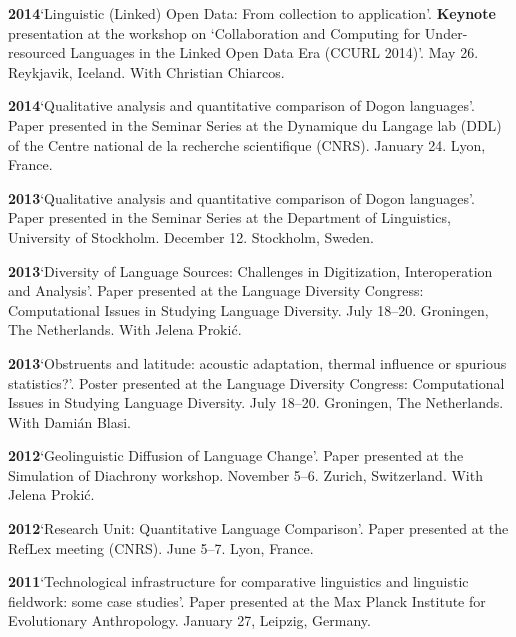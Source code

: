 \documentclass[11pt]{article}
\newcommand{\hangpara}{
 \setlength{\parindent}{0in} %
 \hangindent=0.42in %
}
\begin{document}
\vskip 6pt
\hangpara
{\bf 2014}\hspace{1ex}`Linguistic (Linked) Open Data: From collection to application'. \textbf{Keynote} presentation at the workshop on `Collaboration and Computing for Under-resourced Languages in the Linked Open Data Era (CCURL 2014)'. May 26. Reykjavik, Iceland. With Christian Chiarcos.

\vskip 6pt
\hangpara
{\bf 2014}\hspace{1ex}`Qualitative analysis and quantitative comparison of Dogon languages'. Paper presented in the Seminar Series at the Dynamique du Langage lab (DDL) of the Centre national de la recherche scientifique (CNRS). January 24. Lyon, France.

\vskip 6pt
\hangpara
{\bf 2013}\hspace{1ex}`Qualitative analysis and quantitative comparison of Dogon languages'. Paper presented in the Seminar Series at the Department of Linguistics, University of Stockholm. December 12. Stockholm, Sweden.

\vskip 6pt
\hangpara
{\bf 2013}\hspace{1ex}`Diversity of Language Sources: Challenges in Digitization, Interoperation and Analysis'. Paper presented at the Language Diversity Congress: Computational Issues in Studying Language Diversity. July 18--20. Groningen, The Netherlands. With Jelena Proki{\'c}.

\vskip 6pt
\hangpara
{\bf 2013}\hspace{1ex}`Obstruents and latitude: acoustic adaptation, thermal influence or spurious statistics?'. Poster presented at the Language Diversity Congress: Computational Issues in Studying Language Diversity. July 18--20. Groningen, The Netherlands. With Dami{\'a}n Blasi.

\vskip 6pt
\hangpara
{\bf 2012}\hspace{1ex}`Geolinguistic Diffusion of Language Change'. Paper presented at the Simulation of Diachrony workshop. November 5--6. Zurich, Switzerland. With Jelena Proki{\'c}.

\vskip 6pt
\hangpara
{\bf 2012}\hspace{1ex}`Research Unit: Quantitative Language Comparison'. Paper presented at the RefLex meeting (CNRS). June 5--7. Lyon, France. 

\vskip 6pt
\hangpara
{\bf 2011}\hspace{1ex}`Technological infrastructure for comparative linguistics and linguistic fieldwork: some case studies'. Paper presented at the Max Planck Institute for Evolutionary Anthropology. January 27, Leipzig, Germany. 
\end{document}
